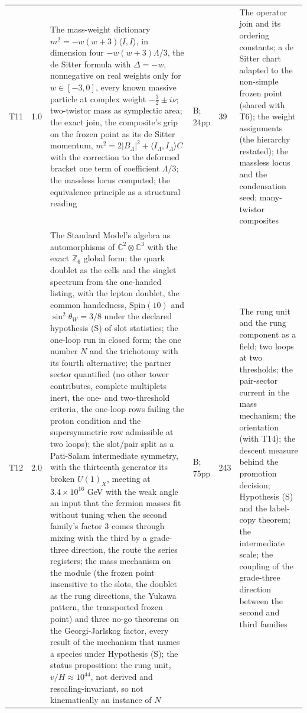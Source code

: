 \documentclass[11pt]{article}
\theoremstyle{definition}
\newcommand{\C}{\mathbb{C}}
\newcommand{\Z}{\mathbb{Z}}
\begin{document}
\begin{longtable}{p{} p{} p{} p{} p{} p{}}
T11 & 1.0 & The mass-weight dictionary $m^{2} = -w(w+3)\langle I, I\rangle$, in dimension four $-w(w+3)\Lambda/3$, the de Sitter formula with $\Delta = -w$, nonnegative on real weights only for $w \in [-3, 0]$, every known massive particle at complex weight $-\tfrac32 \pm i\nu$; two-twistor mass as symplectic area; the exact join, the composite's grip on the frozen point as its de Sitter momentum, $m^{2} = 2|B_{\Lambda}|^{2} + \langle I_{\Lambda}, I_{\Lambda}\rangle C$ with the correction to the deformed bracket one term of coefficient $\Lambda/3$; the massless locus computed; the equivalence principle as a structural reading \cite{ButlerT11} & B; 24pp & 39 & The operator join and its ordering constants; a de Sitter chart adapted to the non-simple frozen point (shared with T6); the weight assignments (the hierarchy restated); the massless locus and the condensation seed; many-twistor composites \\
T12 & 2.0 & The Standard Model's algebra as automorphisms of $\C^{2}\otimes\C^{3}$ with the exact $\Z_{6}$ global form; the quark doublet as the cells and the singlet spectrum from the one-handed listing, with the lepton doublet, the common handedness, $\mathrm{Spin}(10)$ and $\sin^{2}\theta_{W} = 3/8$ under the declared hypothesis (S) of slot statistics; the one-loop run in closed form; the one number $N$ and the trichotomy with its fourth alternative; the partner sector quantified (no other tower contributes, complete multiplets inert, the one- and two-threshold criteria, the one-loop rows failing the proton condition and the supersymmetric row admissible at two loops); the slot/pair split as a Pati-Salam intermediate symmetry, with the thirteenth generator its broken $U(1)_{X}$, meeting at $3.4 \times 10^{16}$ GeV with the weak angle an input that the fermion masses fit without tuning when the second family's factor $3$ comes through mixing with the third by a grade-three direction, the route the series registers; the mass mechanism on the module (the frozen point insensitive to the slots, the doublet as the rung directions, the Yukawa pattern, the transported frozen point) and three no-go theorems on the Georgi-Jarlskog factor, every result of the mechanism that names a species under Hypothesis (S); the status proposition: the rung unit, $v/H \approx 10^{44}$, not derived and rescaling-invariant, so not kinematically an instance of $N$ \cite{ButlerT12} & B; 75pp & 243 & The rung unit and the rung component as a field; two loops at two thresholds; the pair-sector current in the mass mechanism; the orientation (with T14); the descent measure behind the promotion decision; Hypothesis (S) and the label-copy theorem; the intermediate scale; the coupling of the grade-three direction between the second and third families \\

\end{longtable}
\end{document}
